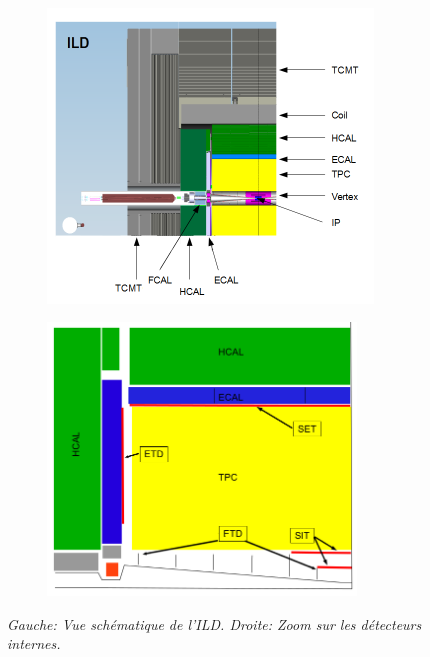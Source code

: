 \begin{figure}
	\centering
	\begin{subfigure}{0.5\textwidth}
		\includegraphics[width=0.95\textwidth]{graphics/ILD.png}
		
	\end{subfigure}%
	\begin{subfigure}{0.5\textwidth}
		\centering
		\includegraphics[width=0.9\textwidth]{graphics/ILDtracking.png}
		
	\end{subfigure}
	\caption{\sl Gauche: Vue sch\'ematique de l'ILD. Droite: Zoom sur les détecteurs internes.}
	\label{fig:ILDSchemeF}
\end{figure}
\newpage
